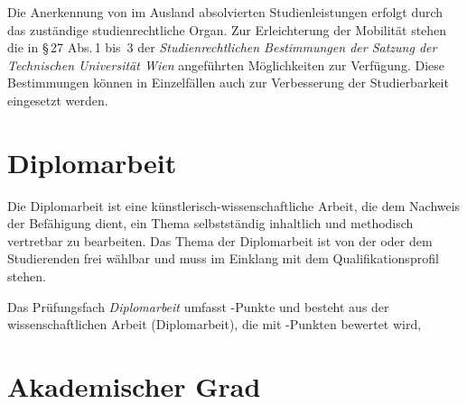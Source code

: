 Die Anerkennung von im Ausland absolvierten Studienleistungen erfolgt
durch das zuständige studienrechtliche Organ.  Zur Erleichterung der
Mobilität stehen die in \S\,27 Abs.\,1 bis~3 der
\emph{Studienrechtlichen Bestimmungen der Satzung der Technischen
  Universität Wien} angeführten Möglichkeiten zur Verfügung. Diese
Bestimmungen können in Einzelfällen auch zur Verbesserung der
Studierbarkeit eingesetzt werden.
%

%


\section{Diplomarbeit}\label{sec:DA}

\newcommand*\PFDA{%
  \ifDASEMINAR{%
    \LV{1,5}{1,0}{SE}{Seminar für Diplomand\_innen}[SeminarFuerDiplomandInnen]\\
  }{}%
  \hspace*{0.9mm} \ECTS{27,0} \hspace*{-0.4mm} Diplomarbeit \\
  \hspace*{0.9mm} \ECTS{3,0} \hspace*{1.6mm} Kommissionelle Abschlussprüfung%
}
\let\PFDASem\PFDA %

Die Diplomarbeit ist eine künstlerisch-wissenschaftliche Arbeit, die 
dem Nachweis der Befähigung dient, ein Thema selbstständig
inhaltlich und methodisch vertretbar zu bearbeiten. Das Thema der
Diplomarbeit ist von der oder dem Studierenden frei wählbar und muss
im Einklang mit dem Qualifikationsprofil stehen.

Das Prüfungsfach \emph{Diplomarbeit} umfasst -Punkte
und besteht aus der wissenschaftlichen Arbeit (Diplomarbeit),
die mit -Punkten bewertet wird,
%

\section{Akademischer Grad}\label{sec:AG}

